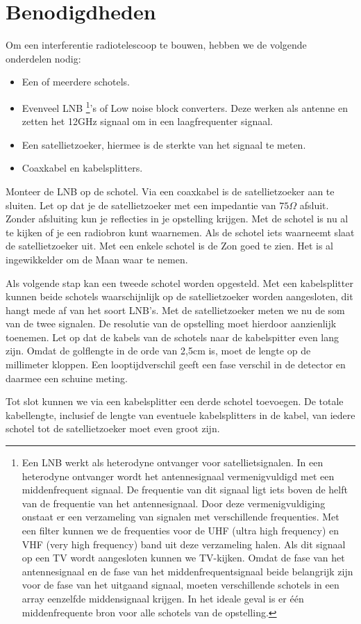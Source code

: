 \section{Benodigdheden}

Om een interferentie radiotelescoop te bouwen, hebben we de volgende
onderdelen nodig:
\begin{itemize}
\item Een of meerdere schotels.
\item Evenveel LNB \footnote{Een LNB werkt als heterodyne ontvanger voor
satellietsignalen. In een heterodyne ontvanger wordt het antennesignaal
vermenigvuldigd met een middenfrequent signaal. De frequentie van dit
signaal ligt iets boven de helft van de frequentie van het
antennesignaal. Door deze vermenigvuldiging onstaat er een verzameling
van signalen met verschillende frequenties. Met een filter kunnen we de
frequenties voor de UHF (ultra high frequency) en VHF (very high
frequency) band uit deze verzameling halen. Als dit signaal op een TV
wordt aangesloten kunnen we TV-kijken. Omdat de fase van het
antennesignaal en de fase van het middenfrequentsignaal beide belangrijk
zijn voor de fase van het uitgaand signaal, moeten verschillende
schotels in een array eenzelfde middensignaal krijgen. In het ideale
geval is er één middenfrequente bron voor alle schotels van de
opstelling.}'s of Low noise block converters. Deze werken als antenne en
zetten het 12GHz signaal om in een laagfrequenter signaal.
\item Een satellietzoeker, hiermee is de sterkte van het signaal te meten.
\item Coaxkabel en kabelsplitters.
\end{itemize}
Monteer de LNB op de schotel. Via een coaxkabel is de satellietzoeker
aan te sluiten. Let op dat je de satellietzoeker met een impedantie
van $75\Omega$ afsluit. Zonder afsluiting kun je reflecties in je
opstelling krijgen. Met de schotel is nu al te kijken of je een radiobron
kunt waarnemen. Als de schotel iets waarneemt slaat de satellietzoeker
uit. Met een enkele schotel is de Zon goed te zien. Het is al ingewikkelder
om de Maan waar te nemen.

Als volgende stap kan een tweede schotel worden opgesteld. Met een
kabelsplitter kunnen beide schotels waar\-schijn\-lijk op de satellietzoeker
worden aangesloten, dit hangt mede af van het soort LNB's. Met de
satellietzoeker meten we nu de som van de twee signalen. De resolutie
van de opstelling moet hierdoor aanzienlijk toenemen. Let op dat de
kabels van de schotels naar de kabelspitter even lang zijn. Omdat
de golflengte in de orde van 2,5cm is, moet de lengte op de millimeter
kloppen. Een looptijdverschil geeft een fase verschil in de detector
en daarmee een schuine meting.

Tot slot kunnen we via een kabelsplitter een derde schotel toevoegen.
De totale kabellengte, inclusief de lengte van eventuele kabelsplitters
in de kabel, van iedere schotel tot de satellietzoeker moet even groot
zijn. 


